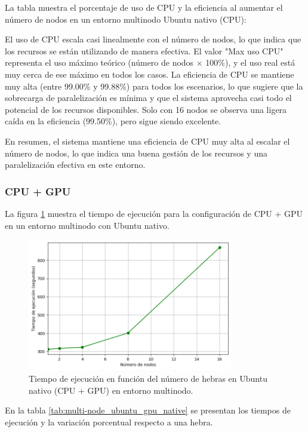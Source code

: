 La tabla muestra el porcentaje de uso de CPU y la eficiencia al aumentar el número de nodos en un entorno multinodo Ubuntu nativo (CPU):

El uso de CPU escala casi linealmente con el número de nodos, lo que indica que los recursos se están utilizando de manera efectiva. El valor "Max uso CPU" representa el uso máximo teórico (número de nodos $\times$ 100\%), y el uso real está muy cerca de ese máximo en todos los casos. La eficiencia de CPU se mantiene muy alta (entre 99.00\% y 99.88\%) para todos los escenarios, lo que sugiere que la sobrecarga de paralelización es mínima y que el sistema aprovecha casi todo el potencial de los recursos disponibles. Solo con 16 nodos se observa una ligera caída en la eficiencia (99.50\%), pero sigue siendo excelente.

En resumen, el sistema mantiene una eficiencia de CPU muy alta al escalar el número de nodos, lo que indica una buena gestión de los recursos y una paralelización efectiva en este entorno.

\subsubsection{CPU + GPU}

La figura \ref{fig:multi-node_ubuntu_gpu_native_time} muestra el tiempo de ejecución para la configuración de CPU + GPU en un entorno multinodo con Ubuntu nativo.

\begin{figure}[H]
    \centering
    \includegraphics[width=0.8\textwidth]{imagenes/cap5/multi-node_ubuntu_gpu_native_time.png}
    \caption{Tiempo de ejecución en función del número de hebras en Ubuntu nativo (CPU + GPU) en entorno multinodo.}
    \label{fig:multi-node_ubuntu_gpu_native_time}
\end{figure}

En la tabla \ref{tab:multi-node_ubuntu_gpu_native} se presentan los tiempos de ejecución y la variación porcentual respecto a una hebra.


